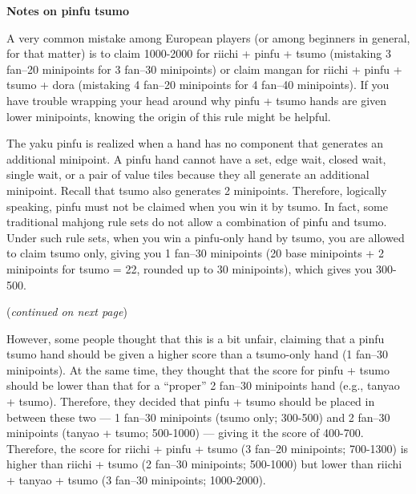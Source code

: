 \newpage
\begin{boxnote} \small
{\bf\normalsize Notes on {\jap pinfu tsumo}}
\bigskip

A very common mistake among European players (or among beginners in general, for that matter) is to claim 1000-2000 for {\jap riichi} + {\jap pinfu + tsumo} (mistaking 3 {\jap fan}--20 minipoints for 3 {\jap fan}--30 minipoints) or claim {\jap mangan} for {\jap riichi} + {\jap pinfu + tsumo + dora} (mistaking 4 {\jap fan}--20 minipoints for 4 {\jap fan}--40 minipoints). 
If you have trouble wrapping your head around why {\jap pinfu + tsumo} hands are given lower minipoints, knowing the origin of this rule might be helpful. 
\bigskip

The {\jap yaku} {\jap pinfu} is realized when a hand has no component that generates an additional minipoint. A {\jap pinfu} hand cannot have a set, edge wait, closed wait, single wait, or a pair of value tiles because they all generate an additional minipoint. Recall that {\jap tsumo} also generates 2 minipoints. Therefore, logically speaking, {\jap pinfu} must not be claimed when you win it by {\jap tsumo}. In fact, some traditional mahjong rule sets do not allow a combination of {\jap pinfu} and {\jap tsumo}. 
Under such rule sets, when you win a {\jap pinfu}-only hand by {\jap tsumo}, you are allowed to claim {\jap tsumo} only, giving you 1 {\jap fan}--30 minipoints (20 base minipoints + 2 minipoints for {\jap tsumo} = 22, rounded up to 30 minipoints), which gives you 300-500.  

\hfill (\textit{continued on next page})

\end{boxnote}

\newpage
\begin{boxnote} \small
However, some people thought that this is a bit unfair, claiming that a {\jap pinfu tsumo} hand should be given a higher score than a {\jap tsumo}-only hand (1 {\jap fan}--30 minipoints). At the same time, they thought that the score for {\jap pinfu + tsumo} should be lower than that for a ``proper'' 2 {\jap fan}--30 minipoints hand (e.g., {\jap tanyao + tsumo}). 
Therefore, they decided that {\jap pinfu + tsumo} should be placed in between these two --- 1 {\jap fan}--30 minipoints ({\jap tsumo} only; 300-500) and 2 {\jap fan}--30 minipoints ({\jap tanyao + tsumo}; 500-1000) --- giving it the score of 400-700. Therefore, the score for {\jap riichi} + {\jap pinfu + tsumo} (3 {\jap fan}--20 minipoints; 700-1300) is higher than {\jap riichi} + {\jap tsumo} (2 {\jap fan}--30 minipoints; 500-1000) but lower than {\jap riichi} + {\jap tanyao + tsumo} (3 {\jap fan}--30 minipoints; 1000-2000). 
\end{boxnote}

